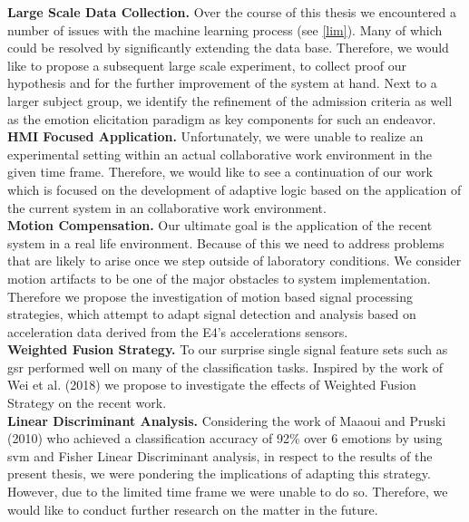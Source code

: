 \textbf{Large Scale Data Collection.}
Over the course of this thesis we encountered a number of issues with the machine learning process (see \ref{lim}). Many of which could be resolved by significantly extending the data base. Therefore, we would like to propose a subsequent large scale experiment, to collect proof our hypothesis and for the further improvement of the system at hand. Next to a larger subject group, we identify the refinement of the admission criteria as well as the emotion elicitation paradigm as key components for such an endeavor.\\[10pt]
\textbf{HMI Focused Application.}
Unfortunately, we were unable to realize an experimental setting within an actual collaborative work environment in the given time frame. Therefore, we would like to see a continuation of our work which is focused on the development of adaptive logic based on the application of the current system in an collaborative work environment.\\[10pt]
\textbf{Motion Compensation.}
Our ultimate goal is the application of the recent system in a real life environment. Because of this we need to address problems that are likely to arise once we step outside of laboratory conditions. We consider motion artifacts to be one of the major obstacles to system implementation. Therefore we propose the investigation of motion based signal processing strategies, which attempt to adapt signal detection and analysis based on acceleration data derived from the E4's accelerations sensors.\\[10pt]
\textbf{Weighted Fusion Strategy.}
To our surprise single signal feature sets such as \gls{gsr} performed well on many of the classification tasks. Inspired by the work of Wei et al. (2018) we propose to investigate the effects of Weighted Fusion Strategy on the recent work.\\[10pt]
\newpage
\textbf{Linear Discriminant Analysis.}
Considering  the work of Maaoui and Pruski (2010) who achieved a classification accuracy of 92\% over 6 emotions by using \gls{svm} and Fisher Linear Discriminant analysis, in respect to the results of the present thesis, we were pondering the implications of adapting this strategy. However, due to the limited time frame we were unable to do so. Therefore, we would like to conduct further research on the matter in the future.


